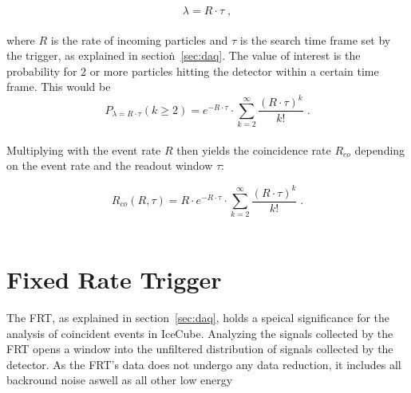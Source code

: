 \begin{equation}
    \lambda = R \cdot \tau \; ,
\end{equation}\\

where $R$ is the rate of incoming particles and $\tau$ is the search time frame set by the trigger, as explained in section\.~\ref{sec:daq}. 
The value of interest is the probability for 2 or more particles hitting the detector within a certain time frame. This would be \\

\begin{equation}
    P_{\lambda = R\cdot\tau}(k\geq2) = e^{- R\cdot\tau} \cdot \sum_{k=2}^\infty \frac{{(R\cdot\tau)}^k}{k!} \; .
\end{equation}\\ 

Multiplying with the event rate $R$ then yields the coincidence rate $R_{co}$ depending on the event rate and the readout window $\tau$:

\begin{equation}
    R_{co}(R,\tau) = R \cdot e^{- R\cdot\tau} \cdot \sum_{k=2}^\infty \frac{{(R\cdot\tau)}^k}{k!}\;.
\end{equation}\\

\section{Fixed Rate Trigger}

The FRT, as explained in section\@~\ref{sec:daq}, holds a speical significance for the analysis of coincident events in IceCube. 
Analyzing the signals collected by the FRT opens a window into the unfiltered distribution of signals collected by the detector. 
As the FRT's data does not undergo any data reduction, it includes all backround noise aswell as all other low energy 

